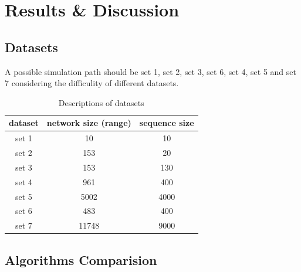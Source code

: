 \documentclass[compress]{beamer}
\begin{document}
\section{Results \& Discussion}

\subsection{Datasets}

\begin{frame}
A possible simulation path should be set 1, set 2, set 3, set 6, set 4, set 5 and set 7 considering the difficulity of different datasets.
\begin{table}[htbp]
  \centering
  \caption{Descriptions of datasets}
    \begin{tabular}{ccc}
    \toprule
    dataset & network size (range) & sequence size \\
    \midrule
    set 1 & 10 & 10 \\
    set 2 & 153 & 20 \\
    set 3 & 153 & 130 \\
    set 4 & 961 & 400 \\
    set 5 & 5002 & 4000 \\
    set 6 & 483 & 400 \\
    set 7 & 11748 & 9000 \\
    \bottomrule
    \end{tabular}%
  \label{tab:datasets}%
\end{table}%
\end{frame}

\subsection{Algorithms Comparision}
\end{document}
